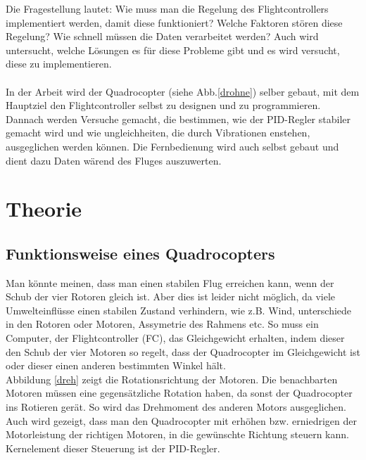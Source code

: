 \documentclass[12pt,a4paper, ngerman]{article}
\begin{document}
\fi
Die Fragestellung lautet: Wie muss man die Regelung des Flightcontrollers implementiert werden, damit diese funktioniert? Welche Faktoren stören diese Regelung? Wie schnell müssen die Daten verarbeitet werden? Auch wird untersucht, welche Lösungen es für diese Probleme gibt und es wird versucht, diese zu implementieren. \\ \\
In der Arbeit wird der Quadrocopter (siehe Abb.\ref{drohne}) selber gebaut, mit dem Hauptziel den Flightcontroller selbst zu designen und zu programmieren. Dannach werden Versuche gemacht, die bestimmen, wie der PID-Regler stabiler gemacht wird und wie ungleichheiten, die durch Vibrationen enstehen, ausgeglichen werden können. Die Fernbedienung wird auch selbst gebaut und dient dazu Daten wärend des Fluges auszuwerten. 
\newpage
\section{Theorie}
\subsection{Funktionsweise eines Quadrocopters}
Man könnte meinen, dass man einen stabilen Flug erreichen kann, wenn der Schub der vier Rotoren gleich ist. Aber dies ist leider nicht möglich, da viele Umwelteinflüsse einen stabilen Zustand verhindern, wie z.B. Wind, unterschiede in den Rotoren oder Motoren, Assymetrie des Rahmens etc. So muss ein Computer, der Flightcontroller (FC), das Gleichgewicht erhalten, indem dieser den Schub der vier Motoren so regelt, dass der Quadrocopter im Gleichgewicht ist oder dieser einen anderen bestimmten Winkel hält.\\
Abbildung \ref{dreh} zeigt die Rotationsrichtung der Motoren. Die benachbarten Motoren müssen eine gegensätzliche Rotation haben, da sonst der Quadrocopter ins Rotieren gerät. So wird das Drehmoment des anderen Motors ausgeglichen. Auch wird gezeigt, dass man den Quadrocopter mit erhöhen bzw. erniedrigen der Motorleistung der richtigen Motoren, in die gewünschte Richtung steuern kann. Kernelement dieser Steuerung ist der PID-Regler.
\newpage
\end{document}
